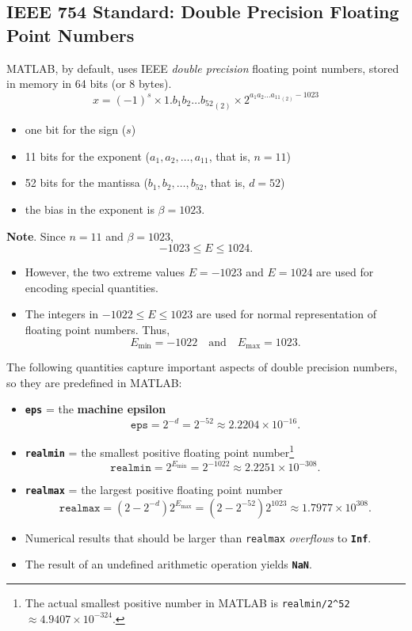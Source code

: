 \documentclass[]{ximera}
\begin{document}
\subsection{IEEE 754 Standard: Double Precision Floating Point Numbers}
MATLAB, by default, uses IEEE \emph{double precision} floating point numbers, stored in memory in 64 bits (or 8 bytes).
\begin{equation*}
  x = (-1)^s \times 1.b_1 b_2 \ldots {b_{52}}_{(2)} \times 2^{a_1 a_2 \ldots {a_{11}}_{(2)} - 1023}
\end{equation*}

\begin{itemize}
\item one bit for the sign ($s$)
\item 11 bits for the exponent ($a_1, a_2, \ldots, a_{11}$, that is, $n = 11$)
\item 52 bits for the mantissa ($b_1, b_2, \ldots, b_{52}$, that is, $d = 52$)
\item the bias in the exponent is $\beta = 1023$.
\end{itemize}

\textbf{Note}. Since $n=11$ and $\beta = 1023$,
\[
-1023 \le E \le 1024.
\]

\begin{itemize}
\item However, the two extreme values $E = -1023$ and $E = 1024$ are used for encoding special quantities.
\item The integers in $-1022 \le E \le 1023$ are used for normal representation of floating point numbers. Thus,
\[
   E_{\text{min}} = -1022
   \quad\text{and}\quad
   E_{\text{max}} = 1023.
   \]
\end{itemize}

The following quantities capture important aspects of double precision numbers, so they are predefined in MATLAB:

\begin{itemize}
\item \textbf{\texttt{eps}} = the \textbf{machine epsilon}
\[
     \mathtt{eps} = 2^{-d}  = 2^{-52} \approx 2.2204 \times 10^{-16}.
   \]
\item \textbf{\texttt{realmin}} = the smallest positive floating point number\footnote{The actual smallest positive number in MATLAB is \texttt{realmin/2\textasciicircum{}52} $\approx 4.9407 \times 10^{-324}$.}
\[
     \mathtt{realmin} = 2^{E_\text{min}} = 2^{-1022} \approx 2.2251 \times 10^{-308}.
   \]
\item \textbf{\texttt{realmax}} = the largest positive floating point number
\[
     \mathtt{realmax} = (2-2^{-d})2^{E_\text{max}} = (2-2^{-52}) 2^{1023} \approx 1.7977 \times 10^{308}.
   \]
\item Numerical results that should be larger than \texttt{realmax} \emph{overflows} to \textbf{\texttt{Inf}}.
\item The result of an undefined arithmetic operation yields \textbf{\texttt{NaN}}.
\end{itemize}
\end{document}

